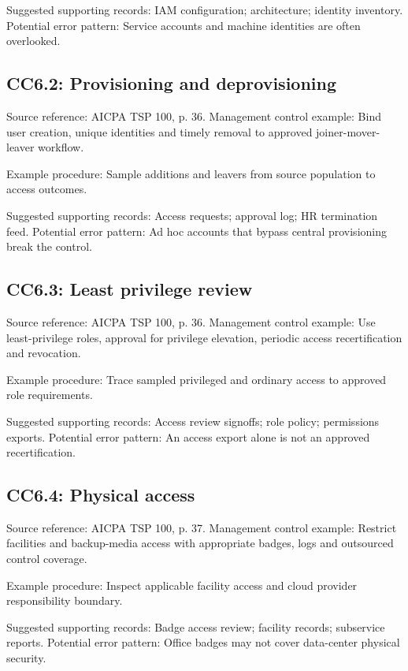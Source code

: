 \documentclass[10pt,oneside]{report}
\begin{document}
Suggested supporting records: IAM configuration; architecture; identity inventory. Potential error pattern: Service accounts and machine identities are often overlooked.

\subsection*{CC6.2: Provisioning and deprovisioning}
Source reference: AICPA TSP 100, p. 36. Management control example: Bind user creation, unique identities and timely removal to approved joiner-mover-leaver workflow.

Example procedure: Sample additions and leavers from source population to access outcomes.

Suggested supporting records: Access requests; approval log; HR termination feed. Potential error pattern: Ad hoc accounts that bypass central provisioning break the control.

\subsection*{CC6.3: Least privilege review}
Source reference: AICPA TSP 100, p. 36. Management control example: Use least-privilege roles, approval for privilege elevation, periodic access recertification and revocation.

Example procedure: Trace sampled privileged and ordinary access to approved role requirements.

Suggested supporting records: Access review signoffs; role policy; permissions exports. Potential error pattern: An access export alone is not an approved recertification.

\subsection*{CC6.4: Physical access}
Source reference: AICPA TSP 100, p. 37. Management control example: Restrict facilities and backup-media access with appropriate badges, logs and outsourced control coverage.

Example procedure: Inspect applicable facility access and cloud provider responsibility boundary.

Suggested supporting records: Badge access review; facility records; subservice reports. Potential error pattern: Office badges may not cover data-center physical security.

\end{document}
